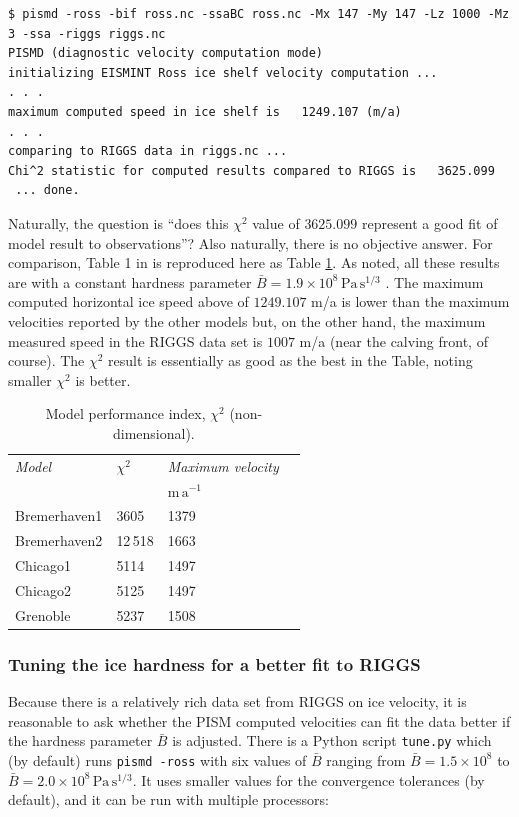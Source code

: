 \documentclass[11pt,final]{amsart}
\begin{document}
\small
\begin{verbatim}
$ pismd -ross -bif ross.nc -ssaBC ross.nc -Mx 147 -My 147 -Lz 1000 -Mz 3 -ssa -riggs riggs.nc
PISMD (diagnostic velocity computation mode)
initializing EISMINT Ross ice shelf velocity computation ...
. . .
maximum computed speed in ice shelf is   1249.107 (m/a)
. . .
comparing to RIGGS data in riggs.nc ...
Chi^2 statistic for computed results compared to RIGGS is   3625.099
 ... done.
\end{verbatim}
\normalsize

Naturally, the question is ``does this $\chi^2$ value of $3625.099$ represent a good fit of model result to observations''?  Also naturally, there is no objective answer.  For comparison, Table 1 in \cite{MacAyealetal} is reproduced here as Table \ref{tab:chisqr}.  As noted, all these results are with a constant hardness parameter $\bar B = 1.9 \times 10^8 \, \text{Pa}\, \text{s}^{1/3}$ \cite{MacAyealetal}.  The maximum computed horizontal ice speed above of $1249.107$ m/a is lower than the maximum velocities reported by the other models but, on the other hand, the maximum measured speed in the RIGGS data set is $1007$ m/a (near the calving front, of course).  The $\chi^2$ result is essentially as good as the best in the Table, noting smaller $\chi^2$ is better.

\small
\begin{table}[ht]
\caption{Model performance index, $\chi^2$ (non-dimensional).  }\label{tab:chisqr}
\begin{tabular}{@{}llll}\hline
\textsl{Model} & $\chi^2$ & \textsl{Maximum velocity} \\
 & & $\text{m}\,\text{a}^{-1}$ \\ \hline
Bremerhaven1 & 3605 & 1379 \\
Bremerhaven2 & 12\,518 & 1663 \\
Chicago1 & 5114 & 1497 \\
Chicago2 & 5125 & 1497 \\
Grenoble & 5237 & 1508 \\
\hline
\end{tabular}
\end{table}
\normalsize

\subsubsection*{Tuning the ice hardness for a better fit to RIGGS}  Because there is a relatively rich data set from RIGGS on ice velocity, it is reasonable to ask whether the PISM computed velocities can fit the data better if the hardness parameter $\bar B$ is adjusted.  There is a Python script \verb|tune.py| which (by default) runs \verb|pismd -ross| with six values of $\bar B$ ranging from $\bar B = 1.5  \times 10^8$ to $\bar B = 2.0 \times 10^8 \, \text{Pa}\, \text{s}^{1/3}$.  It uses smaller values for the convergence tolerances (by default), and it can be run with multiple processors:
\end{document}
